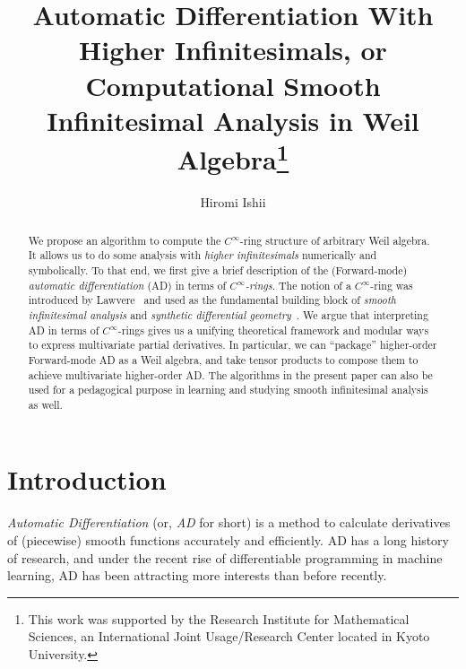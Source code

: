 \title{Automatic Differentiation With Higher Infinitesimals, or Computational Smooth Infinitesimal Analysis in Weil Algebra\thanks{This work was supported by the Research Institute for Mathematical Sciences, an International Joint Usage/Research Center located in Kyoto University.
}}
%
%
\author{Hiromi Ishii}
%
%
%
\maketitle              %
\begin{abstract}
  \frenchspacing
  We propose an algorithm to compute the $C^\infty$-ring structure of arbitrary Weil algebra.
  It allows us to do some analysis with \emph{higher infinitesimals} numerically and symbolically.
  To that end, we first give a brief description of the (Forward-mode) \emph{automatic differentiation} (AD) in terms of \emph{$C^\infty$-rings}.
  The notion of a $C^\infty$-ring was introduced by Lawvere~\cite{lawvere1979categorical} and used as the fundamental building block of \emph{smooth infinitesimal analysis} and \emph{synthetic differential geometry}~\cite{Moerdijk:1991aa}.
  We argue that interpreting AD in terms of $C^\infty$-rings gives us a unifying theoretical framework and modular ways to express multivariate partial derivatives.
  In particular, we can ``package'' higher-order Forward-mode AD as a Weil algebra, and take tensor products to compose them to achieve multivariate higher-order AD.
  The algorithms in the present paper can also be used for a pedagogical purpose in learning and studying smooth infinitesimal analysis as well.
\end{abstract}


\section{Introduction}\label{sec:intro}
\sloppy
\emph{Automatic Differentiation} (or, \emph{AD} for short) is a method to calculate derivatives of (piecewise) smooth functions accurately and efficiently.
AD has a long history of research, and under the recent rise of differentiable programming in machine learning, AD has been attracting more interests than before recently.

